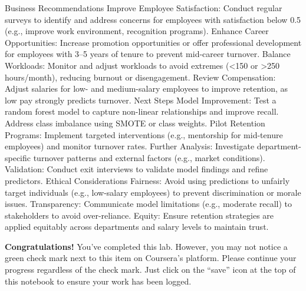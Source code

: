 \documentclass[11pt]{article}
\begin{document}
Business Recommendations Improve Employee Satisfaction: Conduct regular
surveys to identify and address concerns for employees with satisfaction
below 0.5 (e.g., improve work environment, recognition programs).
Enhance Career Opportunities: Increase promotion opportunities or offer
professional development for employees with 3--5 years of tenure to
prevent mid-career turnover. Balance Workloads: Monitor and adjust
workloads to avoid extremes (\textless150 or \textgreater250
hours/month), reducing burnout or disengagement. Review Compensation:
Adjust salaries for low- and medium-salary employees to improve
retention, as low pay strongly predicts turnover. Next Steps Model
Improvement: Test a random forest model to capture non-linear
relationships and improve recall. Address class imbalance using SMOTE or
class weights. Pilot Retention Programs: Implement targeted
interventions (e.g., mentorship for mid-tenure employees) and monitor
turnover rates. Further Analysis: Investigate department-specific
turnover patterns and external factors (e.g., market conditions).
Validation: Conduct exit interviews to validate model findings and
refine predictors. Ethical Considerations Fairness: Avoid using
predictions to unfairly target individuals (e.g., low-salary employees)
to prevent discrimination or morale issues. Transparency: Communicate
model limitations (e.g., moderate recall) to stakeholders to avoid
over-reliance. Equity: Ensure retention strategies are applied equitably
across departments and salary levels to maintain trust.

    \textbf{Congratulations!} You've completed this lab. However, you may
not notice a green check mark next to this item on Coursera's platform.
Please continue your progress regardless of the check mark. Just click
on the ``save'' icon at the top of this notebook to ensure your work has
been logged.


    
    
    
\end{document}
